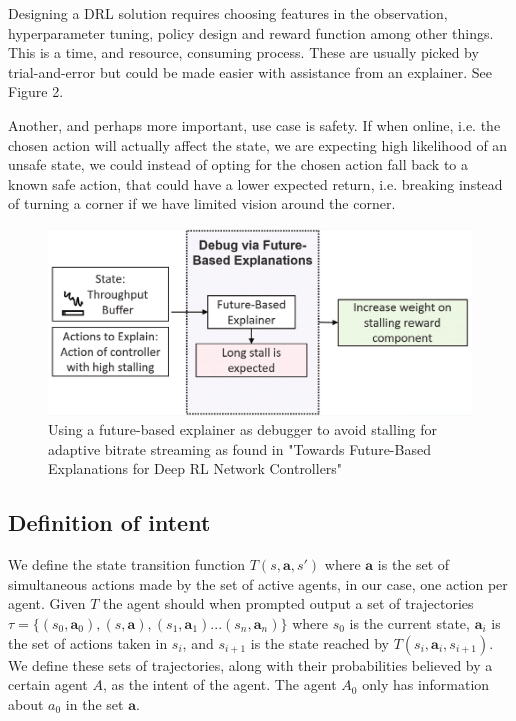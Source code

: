 \documentclass[UKenglish]{uiomasterthesis}
\begin{document}
Designing a DRL solution requires choosing features in the observation,\\ hyperparameter tuning, policy design and reward function among other things. This is a time, and resource, consuming process. These are usually picked by trial-and-error but could be made easier with assistance from an explainer. See Figure 2. 

Another, and perhaps more important, use case is safety. If when online, i.e. the chosen action will actually affect the state, we are expecting high likelihood of an unsafe state, we could instead of opting for the chosen action fall back to a known safe action, that could have a lower expected return, i.e. breaking instead of turning a corner if we have limited vision around the corner.

\begin{figure}
	\includegraphics[width=\textwidth]{images/dog-final.png}
	\caption{Using a future-based explainer as debugger to avoid stalling for adaptive bitrate streaming as found in "Towards Future-Based Explanations for Deep RL Network Controllers" \cite{10.1145/3626570.3626607}}
	\label{fig:environment}
\end{figure}
\medskip

\subsection{Definition of intent}
We define the state transition function $T(s, \textbf{a}, s')$ where $\textbf{a}$ is the set of simultaneous actions made by the set of active agents, in our case, one action per agent. Given $T$ the agent should when prompted output a set of trajectories $\tau = \{(s_0,\textbf{a}_0),(s,\textbf{a}),(s_1,\textbf{a}_1)...(s_n,\textbf{a}_n)\}$ where $s_0$ is the current state, $\textbf{a}_i$ is the set of actions taken in $s_i$, and $s_{i+1}$ is the state reached by $T(s_i,\textbf{a}_i, s_{i+1})$. We define these sets of trajectories, along with their probabilities believed by a certain agent $A$, as the intent of the agent. The agent $A_0$ only has information about $a_0$ in the set $\textbf{a}$.
\end{document}
